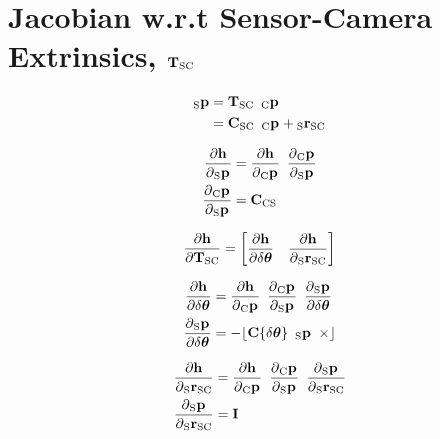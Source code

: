 \section{Jacobian w.r.t Sensor-Camera Extrinsics, $\Tf{\sensor}{\cam}$}

\begin{align}
  \Point{\sensor}{\fiducial_{ij}}
  &=
    \Tf{\sensor}{\cam}
    \enspace \Pt{\cam} \\
  &=
    \Rot{\sensor}{\cam}
    \enspace \Pt{\cam}
		+ \Pos{\sensor}{\cam}
\end{align}

\begin{align}
  \dfrac{\partial{\projFunc}}{\partial{\Pt{\sensor}}}
		&=
			\dfrac{\partial{\projFunc}}{\partial{\Pt{\cam}}}
			\enspace
			\dfrac{\partial{\Pt{\cam}}}{\partial{\Pt{\sensor}}} \\
  \dfrac{\partial{\Pt{\cam}}}{\partial{\Pt{\sensor}}}
		&= \Rot{\cam}{\sensor}
\end{align}


\begin{equation}
  \dfrac{\partial{\projFunc}}{\partial{\Tf{\sensor}{\cam}}}
    =
			\begin{bmatrix}
        \dfrac{\partial{\projFunc}}{\partial{\dtheta}}
				\quad
				\dfrac{\partial{\projFunc}}{\partial{\Pos{\sensor}{\cam}}}
			\end{bmatrix}
\end{equation}


\begin{align}
  \dfrac{\partial{\projFunc}}{\partial{\dtheta}}
    &=
      \dfrac{\partial{\projFunc}}{\partial{\Pt{\cam}}}
			\enspace
      \dfrac{\partial{\Pt{\cam}}}{\partial{\Pt{\sensor}}}
			\enspace
      \dfrac{\partial{\Pt{\sensor}}}{\partial{\dtheta}} \\
	\dfrac{\partial{\Pt{\sensor}}}{\partial{\dtheta}}
    &= -\Skew{\rot\{\dtheta\} \enspace \Pt{\sensor}}
\end{align}


\begin{align}
  \dfrac{\partial{\projFunc}}{\partial{\Pos{\sensor}{\cam}}}
    &=
      \dfrac{\partial{\projFunc}}{\partial{\Pt{\cam}}}
			\enspace
      \dfrac{\partial{\Pt{\cam}}}{\partial{\Pt{\sensor}}}
			\enspace
      \dfrac{\partial{\Pt{\sensor}}}{\partial{\Pos{\sensor}{\cam}}} \\
	\dfrac{\partial{\Pt{\sensor}}}{\partial{\Pos{\sensor}{\cam}}}
	  &= \I \\
\end{align}


